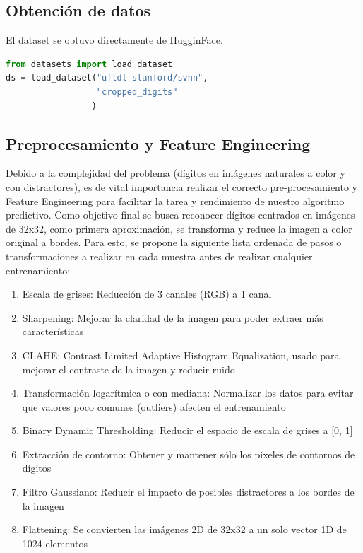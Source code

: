 \documentclass[journal]{IEEEtran}
\begin{document}
\subsection{Obtención de datos}
El dataset se obtuvo directamente de HugginFace.\cite{huggingface_svhn}
\begin{lstlisting}[language=Python]
from datasets import load_dataset
ds = load_dataset("ufldl-stanford/svhn",
                  "cropped_digits"
                 )
\end{lstlisting}


\subsection{Preprocesamiento y Feature Engineering}
Debido a la complejidad del problema (dígitos en imágenes naturales a color y con distractores), es de vital importancia realizar el correcto pre-procesamiento y Feature Engineering para facilitar la tarea y rendimiento de nuestro algoritmo predictivo. Como objetivo final se busca reconocer dígitos centrados en imágenes de 32x32, como primera aproximación, se transforma y reduce la imagen a color original a bordes. Para esto, se propone la siguiente lista ordenada de pasos o transformaciones a realizar en cada muestra antes de realizar cualquier entrenamiento:

\begin{enumerate}
        \item Escala de grises: Reducción de 3 canales (RGB) a 1 canal
        \item Sharpening: Mejorar la claridad de la imagen para poder extraer más características
        \item CLAHE: Contrast Limited Adaptive Histogram Equalization, usado para mejorar el contraste de la imagen y reducir ruido
        \item Transformación logarítmica o con mediana: Normalizar los datos para evitar que valores poco comunes (outliers) afecten el entrenamiento
        \item Binary Dynamic Thresholding: Reducir el espacio de escala de grises a [0, 1]
        \item Extracción de contorno: Obtener y mantener sólo los pixeles de contornos de dígitos
        \item Filtro Gaussiano: Reducir el impacto de posibles distractores a los bordes de la imagen
        \item Flattening: Se convierten las imágenes 2D de 32x32 a un solo vector 1D de 1024 elementos
\end{enumerate}
\end{document}
